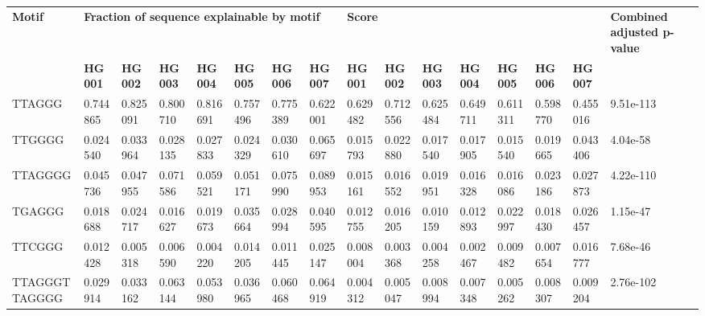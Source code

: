\begin{samepage} \begin{table}[h!] \small \begin{tabular}{llllllllllllllll}
\hline
\textbf{Motif}  & \multicolumn{7}{l}{\textbf{Fraction of sequence explainable by motif}}                                               & \multicolumn{7}{l}{\textbf{Score}}                                                                                   & \textbf{Combined adjusted p-value} \\
\textbf{}       & \textbf{HG001} & \textbf{HG002} & \textbf{HG003} & \textbf{HG004} & \textbf{HG005} & \textbf{HG006} & \textbf{HG007} & \textbf{HG001} & \textbf{HG002} & \textbf{HG003} & \textbf{HG004} & \textbf{HG005} & \textbf{HG006} & \textbf{HG007} & \textbf{}                          \\
\hline
TTAGGG          & 0.744865       & 0.825091       & 0.800710       & 0.816691       & 0.757496       & 0.775389       & 0.622001       & 0.629482       & 0.712556       & 0.625484       & 0.649711       & 0.611311       & 0.598770       & 0.455016       & 9.51e-113                          \\
TTGGGG          & 0.024540       & 0.033964       & 0.028135       & 0.027833       & 0.024329       & 0.030610       & 0.065697       & 0.015793       & 0.022880       & 0.017540       & 0.017905       & 0.015540       & 0.019665       & 0.043406       & 4.04e-58                           \\
TTAGGGG         & 0.045736       & 0.047955       & 0.071586       & 0.059521       & 0.051171       & 0.075990       & 0.089953       & 0.015161       & 0.016552       & 0.019951       & 0.016328       & 0.016086       & 0.023186       & 0.027873       & 4.22e-110                          \\
TGAGGG          & 0.018688       & 0.024717       & 0.016627       & 0.019673       & 0.035664       & 0.028994       & 0.040595       & 0.012755       & 0.016205       & 0.010159       & 0.012893       & 0.022997       & 0.018430       & 0.026457       & 1.15e-47                           \\
TTCGGG          & 0.012428       & 0.005318       & 0.006590       & 0.004220       & 0.014205       & 0.011445       & 0.025147       & 0.008004       & 0.003368       & 0.004258       & 0.002467       & 0.009482       & 0.007654       & 0.016777       & 7.68e-46                           \\
TTAGGGTTAGGGG   & 0.029914       & 0.033162       & 0.063144       & 0.053980       & 0.036965       & 0.060468       & 0.064919       & 0.004312       & 0.005047       & 0.008994       & 0.007348       & 0.005262       & 0.008307       & 0.009204       & 2.76e-102                          \\

\end{tabular}
\end{table}
\end{samepage}

